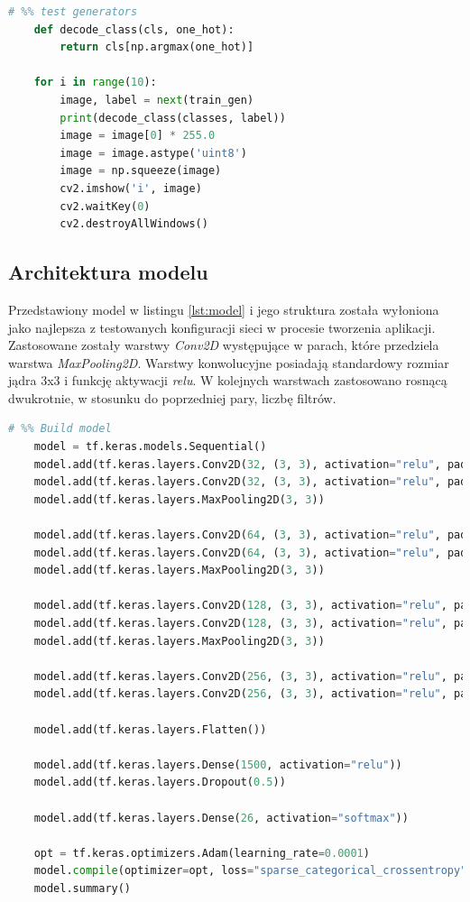 \documentclass[a4paper,12pt,oneside]{book} %
\begin{document}
\begin{lstlisting}[language=Python, caption={Test generatorów}, label={lst:modelgentest}]
	# %% test generators
	def decode_class(cls, one_hot):
		return cls[np.argmax(one_hot)]
		
	for i in range(10):
		image, label = next(train_gen)
		print(decode_class(classes, label))
		image = image[0] * 255.0
		image = image.astype('uint8')
		image = np.squeeze(image)
		cv2.imshow('i', image)
		cv2.waitKey(0)
		cv2.destroyAllWindows()
\end{lstlisting}

\subsection{Architektura modelu}

Przedstawiony model w listingu \ref{lst:model} i jego struktura została wyłoniona jako najlepsza z testowanych konfiguracji sieci w procesie tworzenia aplikacji. Zastosowane zostały warstwy \emph{Conv2D} występujące w parach, które przedziela warstwa \emph{MaxPooling2D}. Warstwy konwolucyjne posiadają standardowy rozmiar jądra 3x3 i funkcję aktywacji \emph{relu}. W kolejnych warstwach zastosowano rosnącą dwukrotnie, w stosunku do poprzedniej pary, liczbę filtrów.

\begin{lstlisting}[language=Python, caption={Definicja modelu}, label={lst:model}]
	 # %% Build model
	model = tf.keras.models.Sequential()
	model.add(tf.keras.layers.Conv2D(32, (3, 3), activation="relu", padding="same", input_shape=(200, 200, 3)))
	model.add(tf.keras.layers.Conv2D(32, (3, 3), activation="relu", padding="same"))
	model.add(tf.keras.layers.MaxPooling2D(3, 3))
	
	model.add(tf.keras.layers.Conv2D(64, (3, 3), activation="relu", padding="same"))
	model.add(tf.keras.layers.Conv2D(64, (3, 3), activation="relu", padding="same"))
	model.add(tf.keras.layers.MaxPooling2D(3, 3))
	
	model.add(tf.keras.layers.Conv2D(128, (3, 3), activation="relu", padding="same"))
	model.add(tf.keras.layers.Conv2D(128, (3, 3), activation="relu", padding="same"))
	model.add(tf.keras.layers.MaxPooling2D(3, 3))
	
	model.add(tf.keras.layers.Conv2D(256, (3, 3), activation="relu", padding="same"))
	model.add(tf.keras.layers.Conv2D(256, (3, 3), activation="relu", padding="same"))
	
	model.add(tf.keras.layers.Flatten())
	
	model.add(tf.keras.layers.Dense(1500, activation="relu"))
	model.add(tf.keras.layers.Dropout(0.5))
	
	model.add(tf.keras.layers.Dense(26, activation="softmax"))
	
	opt = tf.keras.optimizers.Adam(learning_rate=0.0001)
	model.compile(optimizer=opt, loss="sparse_categorical_crossentropy", metrics=['accuracy'])
	model.summary()
\end{lstlisting}
\end{document}
